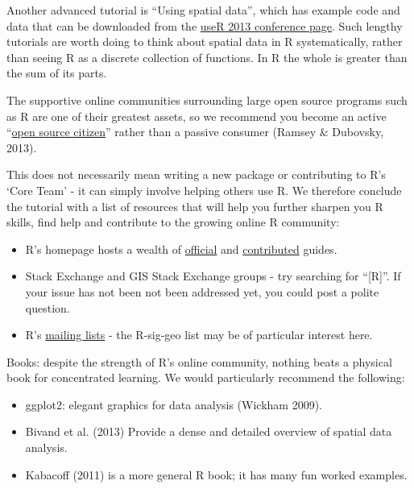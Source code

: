 \documentclass[]{article}
\begin{document}
Another advanced tutorial is ``Using spatial data'', which has example
code and data that can be downloaded from the
\href{http://www.edii.uclm.es/~useR-2013//Tutorials/Bivand.html}{useR
2013 conference page}. Such lengthy tutorials are worth doing to think
about spatial data in R systematically, rather than seeing R as a
discrete collection of functions. In R the whole is greater than the sum
of its parts.

The supportive online communities surrounding large open source programs
such as R are one of their greatest assets, so we recommend you become
an active
``\href{http://blog.cleverelephant.ca/2013/10/being-open-source-citizen.html}{open
source citizen}'' rather than a passive consumer (Ramsey \& Dubovsky,
2013).

This does not necessarily mean writing a new package or contributing to
R's `Core Team' - it can simply involve helping others use R. We
therefore conclude the tutorial with a list of resources that will help
you further sharpen you R skills, find help and contribute to the
growing online R community:

\begin{itemize}
\itemsep1pt\parskip0pt
\item
  R's homepage hosts a wealth of
  \href{http://cran.r-project.org/manuals.html}{official} and
  \href{http://cran.r-project.org/other-docs.html}{contributed} guides.
\item
  Stack Exchange and GIS Stack Exchange groups - try searching for
  ``{[}R{]}''. If your issue has not been not been addressed yet, you
  could post a polite question.
\item
  R's \href{http://www.r-project.org/mail.html}{mailing lists} - the
  R-sig-geo list may be of particular interest here.
\end{itemize}

Books: despite the strength of R's online community, nothing beats a
physical book for concentrated learning. We would particularly recommend
the following:

\begin{itemize}
\itemsep1pt\parskip0pt
\item
  ggplot2: elegant graphics for data analysis (Wickham 2009).
\item
  Bivand et al. (2013) Provide a dense and detailed overview of spatial
  data analysis.
\item
  Kabacoff (2011) is a more general R book; it has many fun worked
  examples.
\end{itemize}
\end{document}
